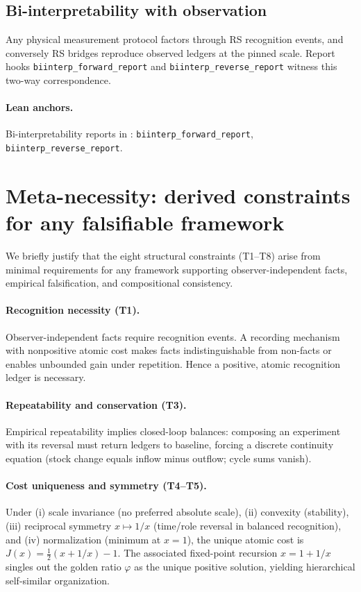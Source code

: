 \documentclass[11pt]{article}
\begin{document}
\subsection{Bi\mbox{-}interpretability with observation}
Any physical measurement protocol factors through RS recognition events, and conversely RS bridges reproduce observed ledgers at the pinned scale. Report hooks \texttt{biinterp\_forward\_report} and \texttt{biinterp\_reverse\_report} witness this two\mbox{-}way correspondence.

\paragraph{Lean anchors.} Bi-interpretability reports in : \texttt{biinterp\_forward\_report}, \texttt{biinterp\_reverse\_report}.

\section{Meta-necessity: derived constraints for any falsifiable framework}\label{sec:meta-necessity}
We briefly justify that the eight structural constraints (T1--T8) arise from minimal requirements for any framework supporting observer-independent facts, empirical falsification, and compositional consistency.

\paragraph{Recognition necessity (T1).} Observer-independent facts require recognition events. A recording mechanism with nonpositive atomic cost makes facts indistinguishable from non-facts or enables unbounded gain under repetition. Hence a positive, atomic recognition ledger is necessary.

\paragraph{Repeatability and conservation (T3).} Empirical repeatability implies closed-loop balances: composing an experiment with its reversal must return ledgers to baseline, forcing a discrete continuity equation (stock change equals inflow minus outflow; cycle sums vanish).

\paragraph{Cost uniqueness and symmetry (T4--T5).} Under (i) scale invariance (no preferred absolute scale), (ii) convexity (stability), (iii) reciprocal symmetry \(x\mapsto 1/x\) (time/role reversal in balanced recognition), and (iv) normalization (minimum at \(x=1\)), the unique atomic cost is \(J(x)=\tfrac{1}{2}(x+1/x)-1\). The associated fixed-point recursion \(x=1+1/x\) singles out the golden ratio \(\varphi\) as the unique positive solution, yielding hierarchical self\mbox{-}similar organization.
\end{document}
